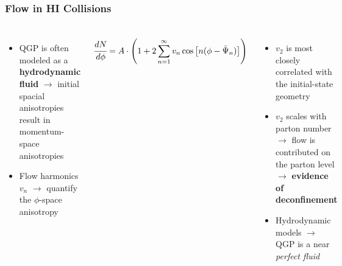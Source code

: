 \begin{frame}
  \frametitle{\textbf{Flow in HI Collisions}}
  \begin{columns}
    \begin{itemize}
    \item QGP is often modeled as a \textbf{hydrodynamic fluid} $\to$ initial spacial anisotropies result in momentum-space anisotropies
    \item Flow harmonics $v_n$ $\to$ quantify the $\phi$-space anisotropy
    \end{itemize}
    \begin{align*}
      \cfrac{dN}{d\phi} = A \cdot \left( 1 + 2\sum_{n = 1}^{\infty} v_n \cos\left[n(\phi - \bar{\Psi}_{n})\right]   \right) 
    \end{align*}
    \begin{itemize}
    \item $v_2$ is most closely correlated with the initial-state geometry
    \item $v_2$ scales with parton number $\to$ flow is contributed on the parton level   $\to$ \textbf{evidence of deconfinement}
    \item Hydrodynamic models $\to$ QGP is a near \textit{perfect fluid}
    \end{itemize}
\end{columns}
\end{frame}
